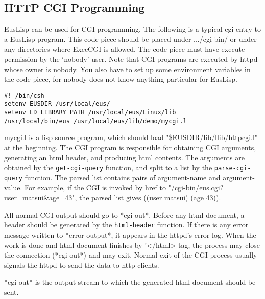 \subsection{HTTP CGI Programming}

EusLisp can be used for  CGI programming.
The following is a typical cgi entry to a EusLisp program.
This code piece should be placed under .../cgi-bin/ or under
any directories where ExecCGI is allowed.  The code piece
must have execute permission by the `nobody' user.
Note that CGI programs are executed by httpd whose owner is
nobody. You also have to set up some environment variables in the
code piece, for nobody does not know anything particular for EusLisp.

\begin{verbatim}
#! /bin/csh
setenv EUSDIR /usr/local/eus/
setenv LD_LIBRARY_PATH /usr/local/eus/Linux/lib
/usr/local/bin/eus /usr/local/eus/lib/demo/mycgi.l
\end{verbatim}

mycgi.l is a lisp source program, which should load
"\$EUSDIR/lib/llib/httpcgi.l" at the beginning.
The CGI program is responsible for obtaining CGI arguments,
generating an html header, and producing html contents.
The arguments are obtained by the {\tt get-cgi-query} function,
and split to a list by the {\tt parse-cgi-query} function.
The parsed list contains pairs of argument-name and argument-value.
For example, if the CGI is invoked by href to
"/cgi-bin/eus.cgi?user=matsui\&age=43",
the parsed list gives ((user matsui) (age 43)).

All normal CGI output should go to *cgi-out*.
Before any html document, a header should be generated
by the {\tt html-header} function.
If there is any error message written to *error-output*,
it appears in the httpd's error-log.
When the work is done and html document finishes by '</html> tag,
the process may close the connection (*cgi-out*) and may exit.
Normal exit of the CGI process usually signals the httpd to
send the data to http clients.


{*cgi-out*} is the output stream to which the generated html document
should be sent.

